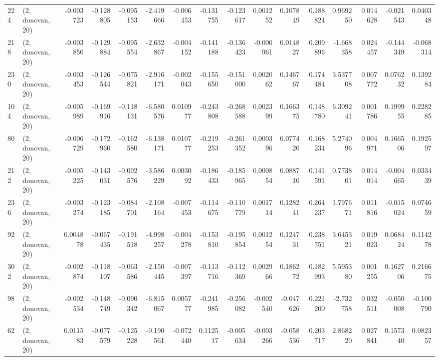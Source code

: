 \begin{tabular}{llrrrrrrrrrrrrrr}
224 &  (2, donovan, 20) &  -0.003723 & -0.128805 & -0.095153 &    -2.419666 &  -0.006453 &  -0.131755 &  -0.123617 &  0.001252 &  0.107849 &  0.188824 &    0.969250 &  0.014628 & -0.021543 &  0.040348 \\
218 &  (2, donovan, 20) &  -0.003850 & -0.129884 & -0.095554 &    -2.632867 &  -0.004152 &  -0.141188 &  -0.136423 & -0.000961 &  0.014827 &  0.209896 &   -1.668358 &  0.024457 & -0.144349 & -0.068314 \\
230 &  (2, donovan, 20) &  -0.003453 & -0.126544 & -0.075821 &    -2.916171 &  -0.002043 &  -0.155650 &  -0.151000 &  0.002062 &  0.146767 &  0.174484 &    3.537708 &  0.007772 &  0.076232 &  0.139284 \\
104 &  (2, donovan, 20) &  -0.005989 & -0.169916 & -0.118131 &    -6.580576 &   0.010977 &  -0.243808 &  -0.268588 &  0.002399 &  0.166375 &  0.148780 &    6.309241 &  0.001786 &  0.199955 &  0.228285 \\
80  &  (2, donovan, 20) &  -0.006729 & -0.172960 & -0.162580 &    -6.138171 &   0.010777 &  -0.219253 &  -0.261352 &  0.000396 &  0.077420 &  0.168234 &    5.274096 &  0.004971 &  0.166506 &  0.192597 \\
212 &  (2, donovan, 20) &  -0.005225 & -0.143031 & -0.092576 &    -3.586229 &   0.003092 &  -0.186433 &  -0.185965 &  0.000854 &  0.088710 &  0.141591 &    0.773801 &  0.014014 & -0.004665 &  0.033439 \\
236 &  (2, donovan, 20) &  -0.003274 & -0.123185 & -0.084701 &    -2.108164 &  -0.007453 &  -0.114675 &  -0.110779 &  0.001714 &  0.128241 &  0.264237 &    1.797671 &  0.011816 & -0.015024 &  0.074659 \\
92  &  (2, donovan, 20) &   0.004878 & -0.067435 & -0.191518 &    -4.998257 &  -0.004278 &  -0.153810 &  -0.195854 &  0.001254 &  0.124731 &  0.238751 &    3.645321 &  0.019023 &  0.068424 &  0.114278 \\
302 &  (2, donovan, 20) &  -0.002874 & -0.118107 & -0.063586 &    -2.150445 &  -0.007397 &  -0.113716 &  -0.112369 &  0.002966 &  0.186272 &  0.182993 &    5.595380 &  0.001255 &  0.162706 &  0.216675 \\
98  &  (2, donovan, 20) &  -0.002534 & -0.148749 & -0.090342 &    -6.815067 &   0.005777 &  -0.241985 &  -0.256082 & -0.002540 & -0.047626 &  0.221200 &   -2.732758 &  0.032511 & -0.050008 & -0.100790 \\
62  &  (2, donovan, 20) &   0.011583 & -0.077579 & -0.125228 &    -0.190561 &  -0.072440 &   0.112517 &  -0.005634 & -0.003266 & -0.058536 &  0.203717 &    2.868220 &  0.027841 &  0.157340 &  0.082357 \\

\end{tabular}
